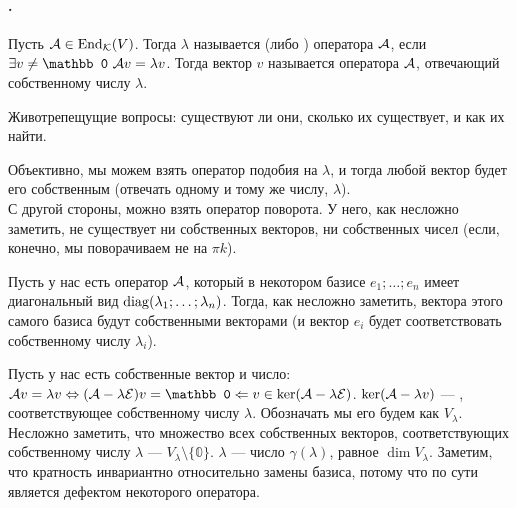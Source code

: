 \documentclass{article}
\newcommand{\id}{{\mathcal{E}}}
\begin{document}
    \paragraph{.}
    \begin{itemize}
        \dfn Пусть ${\mathcal{A}}\in\operatorname{End}_{\mathcal{K}}(V)$. Тогда $\lambda$ называется  (либо ) оператора ${\mathcal{A}}$, если $\exists v\neq\mathbb0~\scriptA v=\lambda v$. Тогда вектор $v$ называется  оператора ${\mathcal{A}}$, отвечающий собственному числу $\lambda$.
        \begin{Comment}
            Животрепещущие вопросы: существуют ли они, сколько их существует, и как их найти.
        \end{Comment}
        \begin{Example}
            Объективно, мы можем взять оператор подобия на $\lambda$, и тогда любой вектор будет его собственным (отвечать одному и тому же числу, $\lambda$).\\
            С другой стороны, можно взять оператор поворота. У него, как несложно заметить, не существует ни собственных векторов, ни собственных чисел (если, конечно, мы поворачиваем не на $\pi k$).
        \end{Example}
        \begin{Example}
            Пусть у нас есть оператор ${\mathcal{A}}$, который в некотором базисе $e_1;\ldots;e_n$ имеет диагональный вид $\operatorname{diag}(\lambda_1;\ldots;\lambda_n)$. Тогда, как несложно заметить, вектора этого самого базиса будут собственными векторами (и вектор $e_i$ будет соответствовать собственному числу $\lambda_i$).
        \end{Example}
        \dfn Пусть у нас есть собственные вектор и число: $\scriptA v=\lambda v\Leftrightarrow(\scriptA-\lambda\id)v=\mathbb0\Leftarrow v\in\ker(\scriptA-\lambda\id)$. $\ker({\mathcal{A}}-\lambda v)$ --- , соответствующее собственному числу $\lambda$. Обозначать мы его будем как $V_\lambda$.
        \thm Несложно заметить, что множество всех собственных векторов, соответствующих собственному числу $\lambda$ --- $V_\lambda\setminus\{\mathbb0\}$.
        \dfn {} $\lambda$ --- число $\gamma(\lambda)$, равное $\dim V_\lambda$.
        \thm Заметим, что кратность инвариантно относительно замены базиса, потому что по сути является дефектом некоторого оператора.

\end{itemize}
\end{document}
